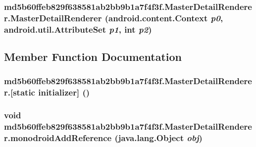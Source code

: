 \hypertarget{classmd5b60ffeb829f638581ab2bb9b1a7f4f3f_1_1_master_detail_renderer_151e8a0190a84dac40712c929fe981f1}{
\subsubsection[{MasterDetailRenderer}]{\setlength{\rightskip}{0pt plus 5cm}md5b60ffeb829f638581ab2bb9b1a7f4f3f.MasterDetailRenderer.MasterDetailRenderer (android.content.Context {\em p0}, \/  android.util.AttributeSet {\em p1}, \/  int {\em p2})}}
\label{classmd5b60ffeb829f638581ab2bb9b1a7f4f3f_1_1_master_detail_renderer_151e8a0190a84dac40712c929fe981f1}




\subsection{Member Function Documentation}
\hypertarget{classmd5b60ffeb829f638581ab2bb9b1a7f4f3f_1_1_master_detail_renderer_c1e5f5ead02baf5c9f7b8f39aa9b7bf3}{
\subsubsection[{[static initializer]}]{\setlength{\rightskip}{0pt plus 5cm}md5b60ffeb829f638581ab2bb9b1a7f4f3f.MasterDetailRenderer.\mbox{[}static initializer\mbox{]} ()}}
\label{classmd5b60ffeb829f638581ab2bb9b1a7f4f3f_1_1_master_detail_renderer_c1e5f5ead02baf5c9f7b8f39aa9b7bf3}


\hypertarget{classmd5b60ffeb829f638581ab2bb9b1a7f4f3f_1_1_master_detail_renderer_8ce806f10f46d2c5af92ef0c1b51986d}{
\subsubsection[{monodroidAddReference}]{\setlength{\rightskip}{0pt plus 5cm}void md5b60ffeb829f638581ab2bb9b1a7f4f3f.MasterDetailRenderer.monodroidAddReference (java.lang.Object {\em obj})}}
\label{classmd5b60ffeb829f638581ab2bb9b1a7f4f3f_1_1_master_detail_renderer_8ce806f10f46d2c5af92ef0c1b51986d}


